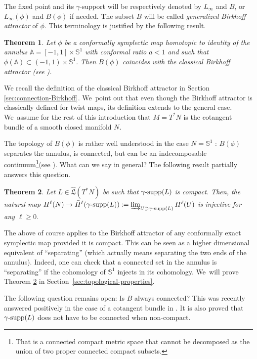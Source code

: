 \documentclass[JEP,XML,SOM,Unicode,NoFloatCountersInSection,published]{cedram}
\newtheorem{thm}{Theorem}[section]
\theoremstyle{definition}
\newcommand{\bS}{\mathbb{S}}
\DeclareMathOperator{\gammasupp}{\gamma\textup{-supp}}
\newcommand{\fL}{\mathfrak {L}}
\newcommand{\hatL}{\widehat{\fL}}
\begin{document}
The fixed point and its $\gamma$\nobreakdash-support will be respectively denoted by $L_\infty$ and $B$, or~$L_\infty(\phi)$ and $B(\phi)$ if needed.
The subset $B$ will be called \emph{generalized Birkhoff attractor} of $\phi$. This terminology is justified by the following result.

\begin{thm}\label{th:annulus-case}
Let $\phi$ be a conformally symplectic map homotopic to identity of the annulus $\mathbb{A}=[-1,1]\times \bS^1$ with conformal ratio $a<1$ and such that $\phi(\mathbb{A})\subset (-1,1)\times\bS^1$. Then $B(\phi)$ coincides with the classical Birkhoff attractor (see \cite{Birkhoff-attractor}).
\end{thm}

We recall the definition of the classical Birkhoff attractor in Section \ref{sec:connection-Birkhoff}. We~point out that even though the Birkhoff attractor is classically defined for twist maps, its definition extends to the general case. We~assume for the rest of this introduction that $M=T^*N$ is the cotangent bundle of a smooth closed manifold $N$.

The topology of $B(\phi)$ is rather well understood in the case $N=\bS^1$ : $B(\phi)$ separates the annulus, is connected, but can be an indecomposable continuum\footnote{That is a connected compact metric space that cannot be decomposed as the union of two proper connected compact subsets.}(see \cite{Charpentier-1, Charpentier-2}). What can we say in general? The following result partially answers this question.

\begin{thm}\label{th:cohomology}
Let $L \in \hatL(T^*N)$ be such that $\gammasupp(L)$ is compact.
Then, the natural map $H^\ell(N)\to \bar H^\ell(\gammasupp(L)):=\varinjlim_{U\supset \gammasupp(L)} H^\ell(U)$ is injective for any $\ell \geq 0$.
\end{thm}

The above of course applies to the Birkhoff attractor of any conformally exact symplectic map provided it is compact. This can be seen as a higher dimensional equivalent of ``separating'' (which actually means separating the two ends of the annulus). Indeed, one can check that a connected set in the annulus is ``separating'' if the cohomology of $\bS^1$ injects in its cohomology. We~will prove Theorem \ref{th:cohomology} in Section~\ref{sec:topological-properties}.

The following question remains open: Is $B$ always connected?
This was recently answered positively in the case of a cotangent bundle in \cite{AGHIV}. It is also proved that $\gammasupp(L)$ does not have to be connected when non-compact.
\end{document}
